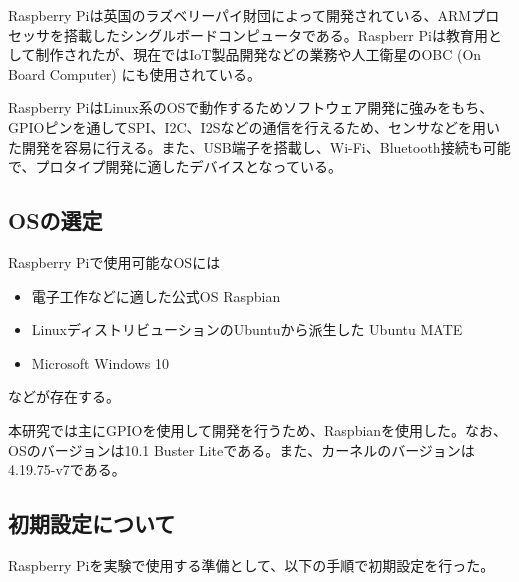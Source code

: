 Raspberry Piは英国のラズベリーパイ財団によって開発されている、ARMプロセッサを搭載したシングルボードコンピュータである。Raspberr
Piは教育用として制作されたが、現在ではIoT製品開発などの業務や人工衛星のOBC (On Board Computer) にも使用されている。

Raspberry PiはLinux系のOSで動作するためソフトウェア開発に強みをもち、GPIOピンを通してSPI、I2C、I2Sなどの通信を行えるため、センサなどを用いた開発を容易に行える。また、USB端子を搭載し、Wi-Fi、Bluetooth接続も可能で、プロタイプ開発に適したデバイスとなっている。

\subsection{OSの選定}\label{choose-os}

Raspberry Piで使用可能なOSには

\begin{itemize}
\tightlist
\item
  電子工作などに適した公式OS Raspbian
\item
  LinuxディストリビューションのUbuntuから派生した Ubuntu MATE
\item
  Microsoft Windows 10
\end{itemize}

などが存在する。

本研究では主にGPIOを使用して開発を行うため、Raspbianを使用した。なお、OSのバージョンは10.1
Buster Liteである。また、カーネルのバージョンは4.19.75-v7である。

\subsection{初期設定について}\label{about-setup}

Raspberry Piを実験で使用する準備として、以下の手順で初期設定を行った。

